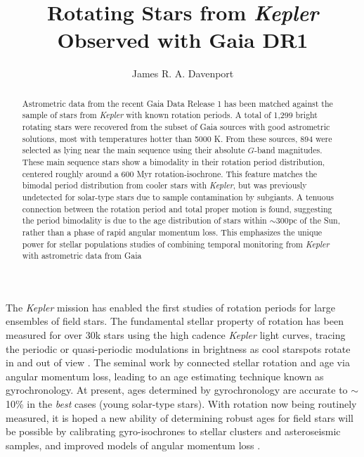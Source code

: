 \documentclass[manuscript, letterpaper]{aastex6}
\makeatletter
\let\origsection\section
\renewcommand\section{\@ifstar{\starsection}{\nostarsection}}
\newcommand\nostarsection[1]{\sectionprelude\origsection{#1}}
\newcommand\starsection[1]{\sectionprelude\origsection*{#1}}
\newcommand\sectionprelude{\vspace{1em}}
\newcommand{\Kepler}{\textsl{Kepler}\xspace}
\makeatother
\begin{document}
\title{Rotating Stars from \Kepler Observed with Gaia DR1}


\author{
	James R. A. Davenport
	}

 

 

\begin{abstract}
Astrometric data from the recent Gaia Data Release 1 has been matched against the sample of stars from \Kepler with known rotation periods. A total of 1,299 bright rotating stars were recovered from the subset of Gaia sources with good astrometric solutions, most with temperatures hotter than 5000 K. From these sources, 894 were selected as lying near the main sequence using their absolute $G$-band magnitudes. These main sequence stars show a bimodality in their rotation period distribution, centered roughly around a 600 Myr rotation-isochrone. This feature matches the bimodal period distribution from cooler stars with \Kepler, but was previously undetected for solar-type stars due to sample contamination by subgiants.
A tenuous connection between the rotation period and total proper motion is found, suggesting the period bimodality is due to the age distribution of stars within $\sim$300pc of the Sun, rather than a phase of rapid angular momentum loss.
This emphasizes the unique power for stellar populations studies of combining temporal monitoring from \Kepler with astrometric data from Gaia
\end{abstract}



\section{Introduction}

The \Kepler mission \citep{borucki2010} has enabled the first studies of rotation periods for large ensembles of field stars. The fundamental stellar property of rotation has been measured for over 30k stars using the high cadence \Kepler light curves, tracing the periodic or quasi-periodic modulations in brightness as cool starspots rotate in and out of view \citep{reinhold2013,mcquillan2014}. The seminal work by \citet{skumanich1972} connected stellar rotation and age via angular momentum loss, leading to an age estimating technique known as gyrochronology. At present, ages determined by gyrochronology are accurate to $\sim$10\% in the {\it best} cases (young solar-type stars). With rotation now being routinely measured, it is hoped a new ability of determining robust ages for field stars will be possible by calibrating gyro-isochrones to stellar clusters and asteroseismic samples, and improved models of angular momentum loss \citep[e.g.][]{angus2015,van-saders2016}. 
\end{document}
